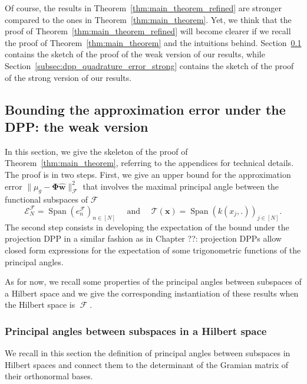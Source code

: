 \documentclass[twoside,11pt]{book}
\DeclareMathOperator{\Span}{\mathrm{Span}}
\DeclareMathOperator{\F}{\mathcal{F}}
\begin{document}
Of course, the results in Theorem~\ref{thm:main_theorem_refined} are stronger compared to the ones in Theorem~\ref{thm:main_theorem}. Yet, we think that the proof of Theorem~\ref{thm:main_theorem_refined} will become clearer if we recall the proof of Theorem~\ref{thm:main_theorem} and the intuitions behind. Section~\ref{subsec:dpp_quadrature_error_weak} contains the sketch of the proof of the weak version of our results, while Section~\ref{subsec:dpp_quadrature_error_strong} contains the sketch of the proof of the strong version of our results.



\subsection{Bounding the approximation error under the DPP: the weak version}
\label{subsec:dpp_quadrature_error_weak}

In this section, we give the skeleton of the proof of Theorem~\ref{thm:main_theorem}, referring to the appendices for technical details. The proof is in two steps. First, we give an upper bound for the approximation error $\|\mu_{g} - \bm{\Phi}\hat{\bm{w}}\|^{2}_{\mathcal{F}}$ that involves the maximal principal angle between the functional subspaces of $\mathcal{F}$
$$\mathcal{E}_N^{\mathcal{F}} = \Span(e_{n}^{\mathcal{F}})_{n \in [N]} \quad\text{ and }\quad \mathcal{T}(\bm{x}) = \Span(k(x_{j},.))_{j \in [N]}.$$
The second step consists in developing the expectation of the bound under the projection DPP in a similar fashion as in Chapter ??: projection DPPs allow closed form expressions for the expectation of some trigonometric functions of the principal angles.

As for now, we recall some properties of the principal angles between subspaces of a Hilbert space and we give the corresponding instantiation of these results when the Hilbert space is $\F$.



\subsubsection{Principal angles between subspaces in a Hilbert space}
\label{subsec:principalangles}
We recall in this section the definition of principal angles between subspaces in Hilbert spaces and connect them to the determinant of the Gramian matrix of their orthonormal bases.
\end{document}
